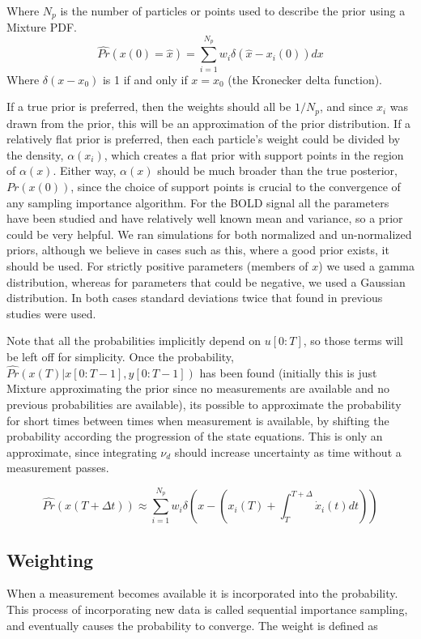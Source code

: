 Where $N_p$ is the number of particles or points used to describe the prior 
using a Mixture PDF. 
\begin{equation}
\hat{Pr}(x(0) = \hat{x}) = \sum_{i=1}^{N_p} w_i\delta(\hat{x} - x_i(0) ) dx
\end{equation}
Where $\delta(x-x_0)$ is 1 if and only if $x = x_0$ (the Kronecker delta function).

If a true prior is preferred, then the weights
should all be $1/N_p$, and since $x_i$ was drawn from the prior, this will
be an approximation of the prior distribution. If a relatively flat prior is 
preferred, then each particle's weight could be divided by the density, $\alpha(x_i)$,
which creates a flat prior with support points in the region of $\alpha(x)$. Either
way, $\alpha(x)$ should be much broader than the true posterior, $Pr(x(0))$, since the
choice of support points is crucial to the convergence of any sampling importance
algorithm. 
For the BOLD signal all the parameters have been studied and have relatively well
known mean and variance, so a prior could be very helpful. We ran simulations for
both normalized and un-normalized priors, although we believe in cases such as this,
where a good prior exists, it should be used. 
For strictly positive parameters (members of $x$) we used a gamma distribution,
whereas for parameters that could be negative, we used a Gaussian distribution. In
both cases standard deviations twice that found in previous studies were used.

Note that all the probabilities implicitly depend on $u[0:T]$, so those terms 
will be left off for simplicity.
Once the probability, $\hat{Pr}(x(T) | x[0:T-1], y[0:T-1])$ has been found
(initially this is just Mixture approximating the prior since no measurements are 
available and no previous probabilities are available), its possible to approximate
the probability for short times between times when measurement is available, by shifting
the probability according the progression of the state equations. This is only 
an approximate, since integrating $\nu_d$ should increase uncertainty as
time without a measurement passes. 

\begin{equation}
\hat{Pr}(x(T+\Delta t)) \approx 
\sum_{i=1}^{N_p} w_i\delta\left(x - (x_i(T) + \int_T^{T+\Delta} \dot{x}_i(t) dt) \right)
\end{equation}

\subsection{Weighting}
When a measurement becomes available it is incorporated into the probability.
This process of incorporating new data is called sequential importance sampling,
and eventually causes the probability to converge. The weight is defined
as

